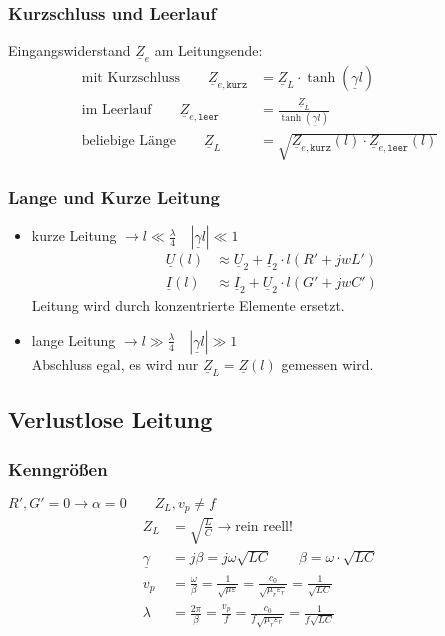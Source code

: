 \subsubsection{Kurzschluss und Leerlauf}
Eingangswiderstand $ \underline{Z}_e $ am Leitungsende:
\begin{align*}
\text{mit Kurzschluss} \qquad \underline{Z}_{e,\texttt{kurz}} & = \underline{Z}_L \cdot \tanh(\underline{\gamma}l)\\
\text{im Leerlauf} \qquad 
\underline{Z}_{e,\texttt{leer}} & = \tfrac{\underline{Z}_L}{\tanh(\underline{\gamma}l)}\\
\text{beliebige Länge} \qquad \underline{Z}_L &=\sqrt{\underline{Z}_{e,\texttt{kurz}}(l)\cdot \underline{Z}_{e,\texttt{leer}}(l)}
\end{align*}
\subsubsection{Lange und Kurze Leitung}
\begin{itemize}
	\item kurze Leitung $\rightarrow l \ll \tfrac{\lambda}{4} \quad |\underline{\gamma}l| \ll 1 $
		\begin{align*}
			\underline{U}(l) &\approx \underline{U}_2 + \underline{I}_2 \cdot l (R' + jwL')\\
			\underline{I}(l) &\approx \underline{I}_2 + \underline{U}_2 \cdot l (G'+jwC')
		\end{align*}
	Leitung wird durch konzentrierte Elemente ersetzt.
	\item lange Leitung $\rightarrow l \gg \tfrac{\lambda}{4} \quad |\underline{\gamma}l| \gg 1$\\
	Abschluss egal, es wird nur $ \underline{Z}_L = \underline{Z}(l) $ gemessen wird.
\end{itemize}


\subsection{Verlustlose Leitung}
\subsubsection{Kenngrößen}
$ R', G' = 0 \rightarrow \alpha = 0 \qquad Z_L, v_p \neq f$
\begin{align*}
	Z_L  & =  \sqrt{\frac{L}{C}} \rightarrow \text{rein reell!}                                                                         \\
    \underline{\gamma}  & = j \beta  = j \omega \sqrt{LC} \qquad \beta = \omega \cdot \sqrt{LC} \\
    v_p                & = \frac{\omega}{\beta} = \frac{1}{\sqrt{\mu\varepsilon}}= \frac{c_0}{\sqrt{\mu_r\varepsilon_r}} = \frac{1}{\sqrt{LC}} \\
    \lambda            & = \frac{2\pi}{\beta}= \frac{v_p}{f}= \frac{c_0}{f\sqrt{\mu_r\varepsilon_r}}=\frac{1}{f\sqrt{LC}}
\end{align*}
